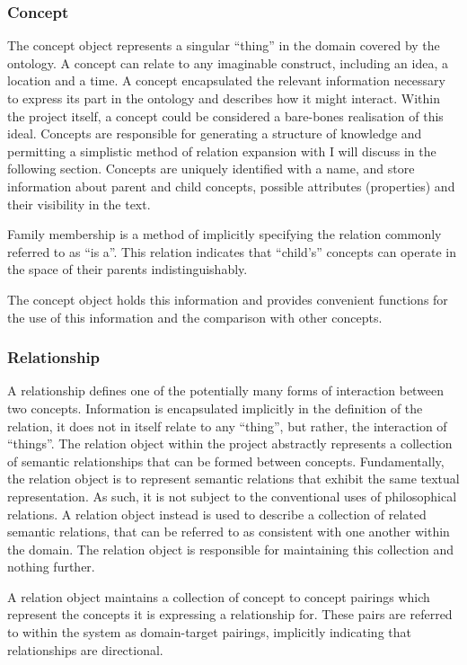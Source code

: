 \documentclass[11pt]{article} %
\begin{document}
\subsubsection{Concept}

The concept object represents a singular “thing” in the domain covered by the ontology. A concept can relate to any imaginable construct, including an idea, a location and a time. A concept encapsulated the relevant information necessary to express its part in the ontology and describes how it might interact. Within the project itself, a concept could be considered a bare-bones realisation of this ideal. Concepts are responsible for generating a structure of knowledge and permitting a simplistic method of relation expansion with I will discuss in the following section. Concepts are uniquely identified with a name, and store information about parent and child concepts, possible attributes (properties) and their visibility in the text.

Family membership is a method of implicitly specifying the relation commonly referred to as “is a”. This relation indicates that “child's” concepts can operate in the space of their parents indistinguishably.

The concept object holds this information and provides convenient functions for the use of this information and the comparison with other concepts.

\subsubsection{Relationship}

A relationship defines one of the potentially many forms of interaction between two concepts. Information is encapsulated implicitly in the definition of the relation, it does not in itself relate to any “thing”, but rather, the interaction of “things”. The relation object within the project abstractly represents a collection of semantic relationships that can be formed between concepts. Fundamentally, the relation object is to represent semantic relations that exhibit the same textual representation. As such, it is not subject to the conventional uses of philosophical relations. A relation object instead is used to describe a collection of related semantic relations, that can be referred to as consistent with one another within the domain. The relation object is responsible for maintaining this collection and nothing further.

A relation object maintains a collection of concept to concept pairings which represent the concepts it is expressing a relationship for. These pairs are referred to within the system as domain-target pairings, implicitly indicating that relationships are directional. 
\end{document}
